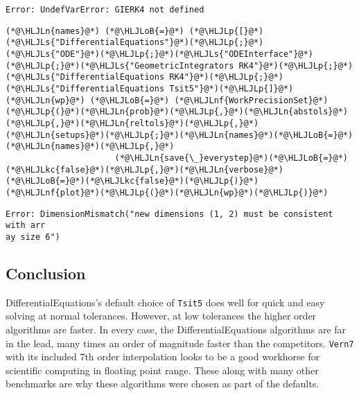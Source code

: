 \documentclass[12pt,a4paper]{article}
\newcommand{\HLJLkc}[1]{\textcolor[RGB]{59,151,46}{\textit{#1}}}
\newcommand{\HLJLn}[1]{#1}
\newcommand{\HLJLnf}[1]{\textcolor[RGB]{66,102,213}{#1}}
\newcommand{\HLJLs}[1]{\textcolor[RGB]{201,61,57}{#1}}
\newcommand{\HLJLoB}[1]{\textcolor[RGB]{102,102,102}{\textbf{#1}}}
\newcommand{\HLJLp}[1]{#1}
\begin{document}
\begin{lstlisting}
Error: UndefVarError: GIERK4 not defined
\end{lstlisting}


\begin{lstlisting}
(*@\HLJLn{names}@*) (*@\HLJLoB{=}@*) (*@\HLJLp{[}@*)(*@\HLJLs{"DifferentialEquations"}@*)(*@\HLJLp{;}@*)(*@\HLJLs{"ODE"}@*)(*@\HLJLp{;}@*)(*@\HLJLs{"ODEInterface"}@*)(*@\HLJLp{;}@*)(*@\HLJLs{"GeometricIntegrators RK4"}@*)(*@\HLJLp{;}@*)(*@\HLJLs{"DifferentialEquations RK4"}@*)(*@\HLJLp{;}@*)(*@\HLJLs{"DifferentialEquations Tsit5"}@*)(*@\HLJLp{]}@*)
(*@\HLJLn{wp}@*) (*@\HLJLoB{=}@*) (*@\HLJLnf{WorkPrecisionSet}@*)(*@\HLJLp{(}@*)(*@\HLJLn{prob}@*)(*@\HLJLp{,}@*)(*@\HLJLn{abstols}@*)(*@\HLJLp{,}@*)(*@\HLJLn{reltols}@*)(*@\HLJLp{,}@*)(*@\HLJLn{setups}@*)(*@\HLJLp{;}@*)(*@\HLJLn{names}@*)(*@\HLJLoB{=}@*)(*@\HLJLn{names}@*)(*@\HLJLp{,}@*)
                      (*@\HLJLn{save{\_}everystep}@*)(*@\HLJLoB{=}@*)(*@\HLJLkc{false}@*)(*@\HLJLp{,}@*)(*@\HLJLn{verbose}@*)(*@\HLJLoB{=}@*)(*@\HLJLkc{false}@*)(*@\HLJLp{)}@*)
(*@\HLJLnf{plot}@*)(*@\HLJLp{(}@*)(*@\HLJLn{wp}@*)(*@\HLJLp{)}@*)
\end{lstlisting}

\begin{lstlisting}
Error: DimensionMismatch("new dimensions (1, 2) must be consistent with arr
ay size 6")
\end{lstlisting}


\subsection{Conclusion}
DifferentialEquations's default choice of \texttt{Tsit5} does well for quick and easy solving at normal tolerances. However, at low tolerances the higher order algorithms are faster. In every case, the DifferentialEquations algorithms are far in the lead, many times an order of magnitude faster than the competitors. \texttt{Vern7} with its included 7th order interpolation looks to be a good workhorse for scientific computing in floating point range. These along with many other benchmarks are why these algorithms were chosen as part of the defaults.
\end{document}
